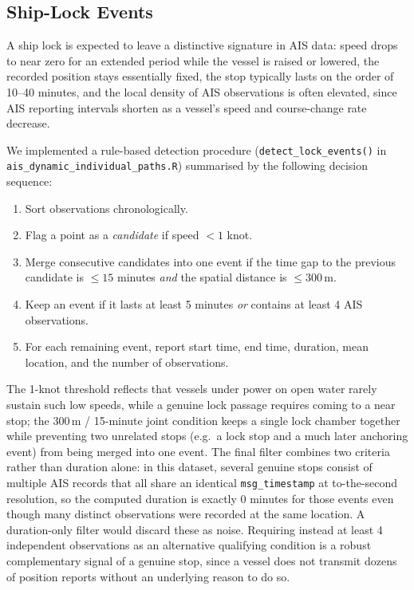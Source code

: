 \documentclass[11pt,a4paper]{article}
\begin{document}
\subsection{Ship-Lock Events}

A ship lock is expected to leave a distinctive signature in AIS data: speed
drops to near zero for an extended period while the vessel is raised or
lowered, the recorded position stays essentially fixed, the stop typically
lasts on the order of 10--40 minutes, and the local density of AIS observations
is often elevated, since AIS reporting intervals shorten as a vessel's speed and
course-change rate decrease.

We implemented a rule-based detection procedure (\texttt{detect\_lock\_events()}
in \texttt{ais\_dynamic\_individual\_paths.R}) summarised by the following
decision sequence:

\begin{enumerate}[noitemsep]
  \item Sort observations chronologically.
  \item Flag a point as a \emph{candidate} if speed $< 1$ knot.
  \item Merge consecutive candidates into one event if the time gap to the
        previous candidate is $\leq 15$ minutes \emph{and} the spatial distance
        is $\leq 300$\,m.
  \item Keep an event if it lasts at least 5 minutes \emph{or} contains at
        least 4 AIS observations.
  \item For each remaining event, report start time, end time, duration,
        mean location, and the number of observations.
\end{enumerate}

The 1-knot threshold reflects that vessels under power on open water rarely
sustain such low speeds, while a genuine lock passage requires coming to a near
stop; the 300\,m / 15-minute joint condition keeps a single lock chamber
together while preventing two unrelated stops (e.g.\ a lock stop and a much
later anchoring event) from being merged into one event. The final filter
combines two criteria rather than duration alone: in this dataset, several
genuine stops consist of multiple AIS records that all share an identical
\texttt{msg\_timestamp} at to-the-second resolution, so the computed duration
is exactly 0 minutes for those events even though many distinct observations
were recorded at the same location. A duration-only filter would discard
these as noise. Requiring instead at least 4 independent observations as an
alternative qualifying condition is a robust complementary signal of a
genuine stop, since a vessel does not transmit dozens of position reports
without an underlying reason to do so.
\end{document}
